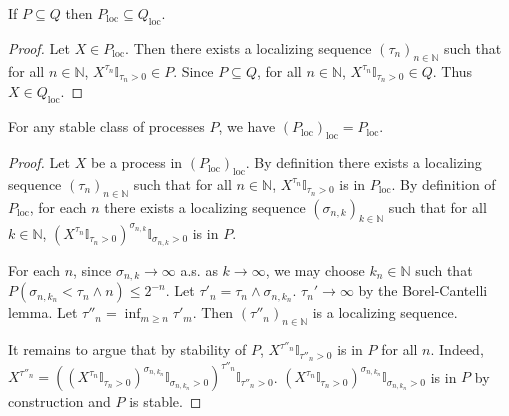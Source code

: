 \begin{lemma}\label{lem:locally_mono}
  \leanok
If $P \subseteq Q$ then $P_{\mathrm{loc}} \subseteq Q_{\mathrm{loc}}$.
\end{lemma}

\begin{proof}
Let $X \in P_{\mathrm{loc}}$.
Then there exists a localizing sequence $(\tau_n)_{n \in \mathbb{N}}$ such that for all $n \in \mathbb{N}$, $X^{\tau_n}\mathbb{I}_{\tau_n > 0} \in P$.
Since $P \subseteq Q$, for all $n \in \mathbb{N}$, $X^{\tau_n}\mathbb{I}_{\tau_n > 0} \in Q$.
Thus $X \in Q_{\mathrm{loc}}$.
\end{proof}


\begin{lemma}\label{lem:locally_locally}
  \leanok
For any stable class of processes $P$, we have $(P_{\mathrm{loc}})_{\mathrm{loc}} = P_{\mathrm{loc}}$.
\end{lemma}

\begin{proof}
Let $X$ be a process in $(P_{\mathrm{loc}})_{\mathrm{loc}}$.
By definition there exists a localizing sequence $(\tau_n)_{n \in \mathbb{N}}$ such that for all $n \in \mathbb{N}$, $X^{\tau_n}\mathbb{I}_{\tau_n > 0}$ is in $P_{\mathrm{loc}}$.
By definition of $P_{\mathrm{loc}}$, for each $n$ there exists a localizing sequence $(\sigma_{n,k})_{k \in \mathbb{N}}$ such that for all $k \in \mathbb{N}$, $(X^{\tau_n}\mathbb{I}_{\tau_n > 0})^{\sigma_{n,k}}\mathbb{I}_{\sigma_{n,k} > 0}$ is in $P$.

For each $n$, since $\sigma_{n,k} \to \infty$ a.s. as $k \to \infty$, we may choose $k_n \in \mathbb{N}$ such that $P(\sigma_{n,k_n} < \tau_n \wedge n) \le 2^{-n}$.
Let $\tau'_n = \tau_n \wedge \sigma_{n,k_n}$. $\tau_n' \to \infty$ by the Borel-Cantelli lemma.
Let $\tau''_n = \inf_{m \ge n} \tau'_m$.
Then $(\tau''_n)_{n \in \mathbb{N}}$ is a localizing sequence.

It remains to argue that by stability of $P$, $X^{\tau''_n}\mathbb{I}_{\tau''_n > 0}$ is in $P$ for all $n$.
Indeed, $X^{\tau''_n} = ((X^{\tau_n}\mathbb{I}_{\tau_n > 0})^{\sigma_{n,k_n}}\mathbb{I}_{\sigma_{n,k_n} > 0})^{\tau''_n}\mathbb{I}_{\tau''_n > 0}$. $(X^{\tau_n}\mathbb{I}_{\tau_n > 0})^{\sigma_{n,k_n}}\mathbb{I}_{\sigma_{n,k_n} > 0}$ is in $P$ by construction and $P$ is stable.
\end{proof}


